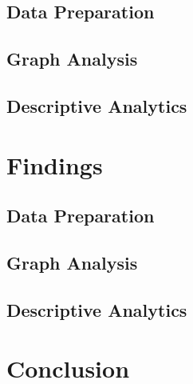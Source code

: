 \documentclass[conference]{IEEEtran}
\begin{document}
\subsection{Data Preparation}


\subsection{Graph Analysis}


\subsection{Descriptive Analytics}


\section{Findings}

\subsection{Data Preparation}


\subsection{Graph Analysis}


\subsection{Descriptive Analytics}


\section{Conclusion}




\end{document}
